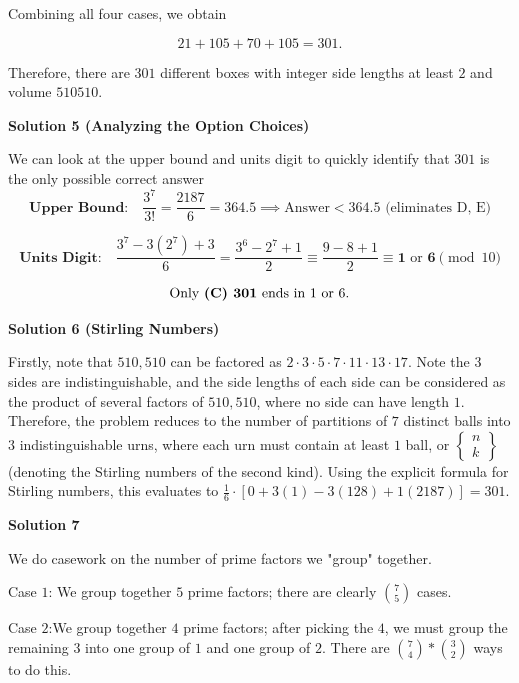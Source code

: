 \begin{enumerate}
 Combining all four cases, we obtain

 
 \[21+105+70+105=\boxed{301}.\]

 Therefore, there are $\boxed{301}$ different boxes with integer side lengths at least $2$ and volume $510510$.

 



\textbf{Solution 5 (Analyzing the Option Choices)}

We can look at the upper bound and units digit to quickly identify that $301$ is the only possible correct answer
 \[\textbf{Upper Bound:} \quad \frac{3^7}{3!} = \frac{2187}{6} = 364.5 \implies \text{Answer} < 364.5 \text{ (eliminates D, E)}\]

 \[\textbf{Units Digit:} \quad \frac{3^7 - 3(2^7) + 3}{6} = \frac{3^6 - 2^7 + 1}{2} \equiv \frac{9 - 8 + 1}{2} \equiv \mathbf{1} \text{ or } \mathbf{6} \pmod{10}\]

 \[\text{Only \textbf{(C) 301} ends in } 1 \text{ or } 6.\]




\textbf{Solution 6 (Stirling Numbers)}

Firstly, note that $510,510$ can be factored as $2 \cdot 3 \cdot 5 \cdot 7 \cdot 11 \cdot 13 \cdot 17$. Note the $3$ sides are indistinguishable, and the side lengths of each side can be considered as the product of several factors of $510,510$, where no side can have length $1$. Therefore, the problem reduces to the number of partitions of $7$ distinct balls into $3$ indistinguishable urns, where each urn must contain at least $1$ ball, or $\left\{ \begin{matrix} n \\ k \end{matrix} \right\}$ (denoting the Stirling numbers of the second kind). Using the explicit formula for Stirling numbers, this evaluates to $\frac{1}{6} \cdot [0+3(1)-3(128)+1(2187)]=\boxed{301}$.

 



\textbf{Solution 7}

We do casework on the number of prime factors we "group" together. 

 Case $1$: We group together $5$ prime factors; there are clearly $\binom{7}{5}$ cases.

 Case $2$:We group together $4$ prime factors; after picking the $4$, we must group the remaining $3$ into one group of $1$ and one group of $2$. There are $\binom{7}{4}*\binom{3}{2}$ ways to do this.


\end{enumerate}
